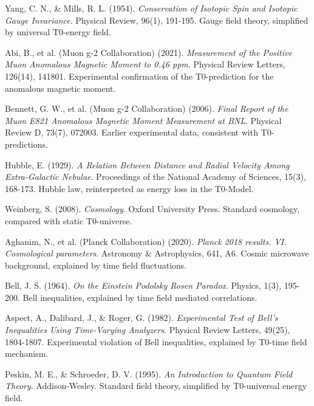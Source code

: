 \documentclass[12pt,a4paper]{report}
\begin{document}
\begin{thebibliography}{50}
		Yang, C. N., \& Mills, R. L. (1954). \textit{Conservation of Isotopic Spin and Isotopic Gauge Invariance}. Physical Review, 96(1), 191-195. Gauge field theory, simplified by universal T0-energy field.
		
		Abi, B., et al. (Muon g-2 Collaboration) (2021). \textit{Measurement of the Positive Muon Anomalous Magnetic Moment to 0.46 ppm}. Physical Review Letters, 126(14), 141801. Experimental confirmation of the T0-prediction for the anomalous magnetic moment.
		
		Bennett, G. W., et al. (Muon g-2 Collaboration) (2006). \textit{Final Report of the Muon E821 Anomalous Magnetic Moment Measurement at BNL}. Physical Review D, 73(7), 072003. Earlier experimental data, consistent with T0-predictions.
		
		Hubble, E. (1929). \textit{A Relation Between Distance and Radial Velocity Among Extra-Galactic Nebulae}. Proceedings of the National Academy of Sciences, 15(3), 168-173. Hubble law, reinterpreted as energy loss in the T0-Model.
		
		Weinberg, S. (2008). \textit{Cosmology}. Oxford University Press. Standard cosmology, compared with static T0-universe.
		
		Aghanim, N., et al. (Planck Collaboration) (2020). \textit{Planck 2018 results. VI. Cosmological parameters}. Astronomy \& Astrophysics, 641, A6. Cosmic microwave background, explained by time field fluctuations.
		
		Bell, J. S. (1964). \textit{On the Einstein Podolsky Rosen Paradox}. Physics, 1(3), 195-200. Bell inequalities, explained by time field mediated correlations.
		
		Aspect, A., Dalibard, J., \& Roger, G. (1982). \textit{Experimental Test of Bell's Inequalities Using Time-Varying Analyzers}. Physical Review Letters, 49(25), 1804-1807. Experimental violation of Bell inequalities, explained by T0-time field mechanism.
		
		Peskin, M. E., \& Schroeder, D. V. (1995). \textit{An Introduction to Quantum Field Theory}. Addison-Wesley. Standard field theory, simplified by T0-universal energy field.
		

\end{thebibliography}
\end{document}
